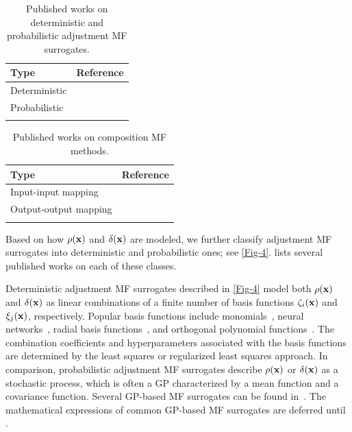 \documentclass[iicol,sn-basic]{sn-jnl}%
\begin{document}
\begin{table}
	\caption{Published works on deterministic and probabilistic adjustment MF surrogates.}
	\label{Table2}
	\centering
	\begin{tabularx}{\textwidth}{lX}
		\hline \noalign{\smallskip}
		Type & Reference\\
		\hline \noalign{\smallskip}
		Deterministic & \cite{ZhangYiming2018,FernandezGodino2019,Song2019,Kou2019,Durantin2017,Han2013,Tyan2015,Nguyen2015,Palar2016,LiuB2016,LYan2019,Rumpfkeil2017,Rumpfkeil2019,Wang2021}  \\
		\noalign{\smallskip}
		Probabilistic &    \cite{Kennedy2000,Forrester2007,Xiong2008,Kuya2011,Toal2011,Han2012,Keane2012,Goh2013,Park2017,Serani2019,Qian2008,Gratiet2013,Gratiet2014,Allaire2014,Parussini2017,Zhou2017kbs,Xiao2018,Ji2023}\\
		\hline \noalign{\smallskip}
	\end{tabularx}
\end{table}

\begin{table}
	\caption{Published works on composition MF methods.}
	\label{Table3}
	\centering
	\begin{tabularx}{\textwidth}{lX}
		\hline \noalign{\smallskip}
		Type & Reference\\
		\hline \noalign{\smallskip}
		Input-input mapping & \cite{Bandler1994,Bandler2004,Koziel2006,Robinson2008,TaoSiyu2019} \\
		\noalign{\smallskip}
		Output-output mapping &  \cite{Zheng2014,Zhou2017aei,Perdikaris2017,Jiang2018,Cutajar2019,Hebbal2021smo,Li2023}   \\
		\hline \noalign{\smallskip}
	\end{tabularx}
\end{table}

Based on how $\rho({\bf {x}})$ and $\delta({\bf{x}})$ are modeled, we further classify adjustment MF surrogates into deterministic and probabilistic ones; see \cref{Fig-4}.
 lists several published works on each of these classes.

Deterministic adjustment MF surrogates described in \cref{Fig-4} model both $\rho({\bf {x}})$ and $\delta({\bf{x}})$ as linear combinations of a finite number of basis functions $\zeta_i({\bf {x}})$ and $\xi_j({\bf x})$, respectively.
Popular basis functions include monomials~\citep{ZhangYiming2018,FernandezGodino2019}, neural networks~\citep{Kou2019}, radial basis functions~\citep{Tyan2015,LiuB2016,Durantin2017}, and orthogonal polynomial functions~\citep{Palar2016}. 
The combination coefficients and hyperparameters associated with the basis functions are determined by the least squares or regularized least squares approach. 
In comparison, probabilistic adjustment MF surrogates describe $\rho({\bf {x}})$ or $\delta({\bf{x}})$ as a stochastic process, which is often a GP characterized by a mean function and a covariance function.   
Several GP-based MF surrogates can be found in~\cite{Brevault2020}.
The mathematical expressions of common GP-based MF surrogates are deferred until .  
\end{document}
